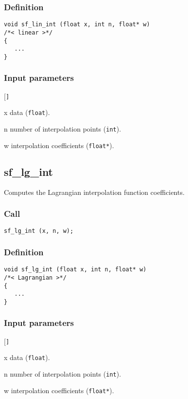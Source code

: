 \subsubsection*{Definition}
\begin{verbatim}
void sf_lin_int (float x, int n, float* w) 
/*< linear >*/
{
   ...
}
\end{verbatim}

\subsubsection*{Input parameters}
\begin{desclist}{\tt }{\quad}[\tt ]
   \setlength\itemsep{0pt}
   \item[x] data (\texttt{float}).  
   \item[n] number of interpolation points (\texttt{int}).  
   \item[w] interpolation coefficients (\texttt{float*}).  
\end{desclist}




\subsection{{sf\_lg\_int}}
Computes the Lagrangian interpolation function coefficients.

\subsubsection*{Call}
\begin{verbatim}sf_lg_int (x, n, w);\end{verbatim}

\subsubsection*{Definition}
\begin{verbatim}
void sf_lg_int (float x, int n, float* w) 
/*< Lagrangian >*/
{
   ...
}
\end{verbatim}

\subsubsection*{Input parameters}
\begin{desclist}{\tt }{\quad}[\tt ]
   \setlength\itemsep{0pt}
   \item[x] data (\texttt{float}).  
   \item[n] number of interpolation points (\texttt{int}).  
   \item[w] interpolation coefficients (\texttt{float*}).  
\end{desclist}




